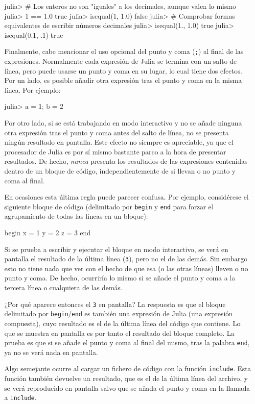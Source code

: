 ﻿\documentclass{article}
\newcommand{\jl}{\texttt}
\begin{document}
julia> # Los enteros no son "iguales" a los decimales, aunque valen lo mismo
julia> 1 == 1.0
true
julia> isequal(1, 1.0)
false
julia> # Comprobar formas equivalentes de escribir números decimales
julia> isequal(1., 1.0)
true
julia> isequal(0.1, .1)
true

Finalmente, cabe mencionar el uso opcional del punto y coma (\jl{;}) al final de las expresiones. Normalmente cada expresión de Julia se termina con un salto de línea, pero puede usarse un punto y coma en su lugar, lo cual tiene dos efectos. Por un lado, es posible añadir otra expresión tras el punto y coma en la misma línea. Por ejemplo:

julia> a = 1; b = 2

Por otro lado, si se está trabajando en modo interactivo y no se añade ninguna otra expresión tras el punto y coma antes del salto de línea, no se presenta ningún resultado en pantalla. Este efecto no siempre es apreciable, ya que el procesador de Julia es por sí mismo bastante parco a la hora de presentar resultados. De hecho, \emph{nunca} presenta los resultados de las expresiones contenidas dentro de un bloque de código, independientemente de si llevan o no punto y coma al final.

En ocasiones esta última regla puede parecer confusa. Por ejemplo, considérese el siguiente bloque de código (delimitado por \jl{begin} y \jl{end} para forzar el agrupamiento de todas las líneas en un bloque):

begin
  x = 1
  y = 2
  z = 3
end

Si se prueba a escribir y ejecutar el bloque en modo interactivo, se verá en pantalla el resultado de la última línea (\jl{3}), pero no el de las demás. Sin embargo esto no tiene nada que ver con el hecho de que esa (o las otras líneas) lleven o no punto y coma. De hecho, ocurriría lo mismo si se añade el punto y coma a la tercera línea o cualquiera de las demás.

¿Por qué aparece entonces el \jl{3} en pantalla? La respuesta es que el bloque delimitado por \jl{begin}/\jl{end} es también una expresión de Julia (una expresión compuesta), cuyo resultado es el de la última línea del código que contiene. Lo que se muestra en pantalla es por tanto el resultado del bloque completo. La prueba es que si se añade el punto y coma al final del mismo, tras la palabra \jl{end}, ya no se verá nada en pantalla.

Algo semejante ocurre al cargar un fichero de código con la función \jl{include}. Esta función también devuelve un resultado, que es el de la última línea del archivo, y se verá reproducido en pantalla salvo que se añada el punto y coma en la llamada a \jl{include}.
\end{document}
